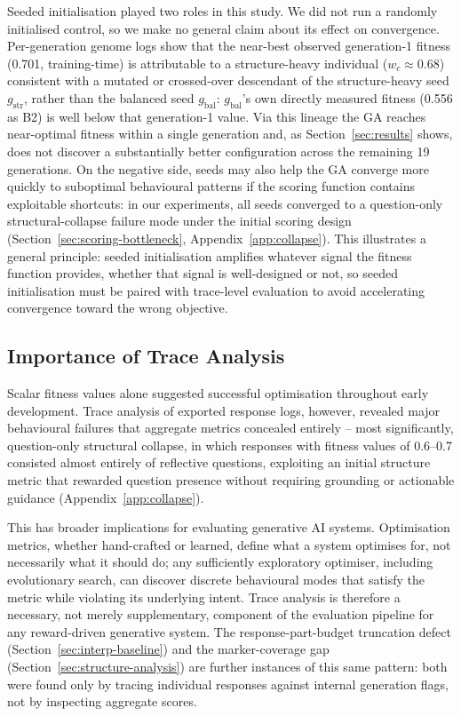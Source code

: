 \documentclass[mathematics,article,submit,xetex,moreauthors]{Definitions/mdpi}
\begin{document}
Seeded initialisation played two roles in this study. We did not run a
randomly initialised control, so we make no general claim about its effect
on convergence. Per-generation genome logs show that the near-best observed generation-1 fitness (0.701,
training-time) is attributable to a structure-heavy individual ($w_c
\approx 0.68$) consistent with a mutated or crossed-over descendant of
the structure-heavy seed $g_\mathrm{str}$, rather than the balanced seed
$g_\mathrm{bal}$: $g_\mathrm{bal}$'s own directly measured fitness (0.556
as B2) is well below that generation-1 value. Via this lineage the GA
reaches near-optimal fitness within a single generation and, as
Section~\ref{sec:results} shows, does not discover a substantially better
configuration across the remaining 19 generations. On the negative side,
seeds may also help the GA converge more quickly to suboptimal behavioural
patterns if the scoring function contains exploitable shortcuts: in our
experiments, all seeds converged to a question-only structural-collapse
failure mode under the initial scoring design
(Section~\ref{sec:scoring-bottleneck}, Appendix~\ref{app:collapse}). This
illustrates a general principle: seeded initialisation amplifies whatever
signal the fitness function provides, whether that signal is well-designed
or not, so seeded initialisation must be paired with trace-level
evaluation to avoid accelerating convergence toward the wrong objective.

\subsection{Importance of Trace Analysis}

Scalar fitness values alone suggested successful optimisation
throughout early development. Trace analysis of exported response logs,
however, revealed major behavioural failures that aggregate metrics
concealed entirely -- most significantly, question-only structural
collapse, in which responses with fitness values of 0.6--0.7 consisted
almost entirely of reflective questions, exploiting an initial structure metric that rewarded
question presence without requiring grounding or actionable guidance
(Appendix~\ref{app:collapse}).

This has broader implications for evaluating generative AI systems.
Optimisation metrics, whether hand-crafted or learned, define what a
system optimises for, not necessarily what it should do; any sufficiently
exploratory optimiser, including evolutionary search, can discover
discrete behavioural modes that satisfy the metric while violating its
underlying intent. Trace analysis is therefore a necessary, not merely
supplementary, component of the evaluation pipeline for any reward-driven
generative system. The response-part-budget truncation defect
(Section~\ref{sec:interp-baseline}) and the marker-coverage gap
(Section~\ref{sec:structure-analysis}) are further instances of this same
pattern: both were found only by tracing individual responses against
internal generation flags, not by inspecting aggregate scores.
\end{document}
